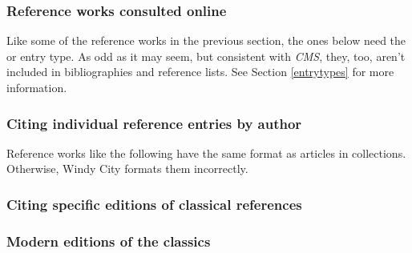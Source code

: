 \documentclass[11pt,letterpaper,oneside]{article}
\begin{document}
\subsubsection{Reference works consulted online}

Like some of the reference works in the previous section, the ones
below need the  or  entry
type. As odd as it may seem, but consistent with \textit{CMS}, they,
too, aren't included in bibliographies and reference lists. See
Section \ref{entrytypes} for more information.

\begin{citeonly}
\item \cite{toscanini2016}
\item \cite{cairns2016}
\item \cite{wikipedia2016}
\item \cite{merriam2016}
\end{citeonly}

\subsubsection{Citing individual reference entries by author}

Reference works like the following have the same format as articles in
collections. Otherwise, Windy City formats them incorrectly.

\begin{citebib}
\item \cite{isaacson2005}
\end{citebib}

\setcounter{subsubsection}{245}
\subsubsection{Citing specific editions of classical references}

\begin{citebib}
\item \cite{epictetus1916}
\end{citebib}

\setcounter{subsubsection}{250}
\subsubsection{Modern editions of the classics}
\end{document}
